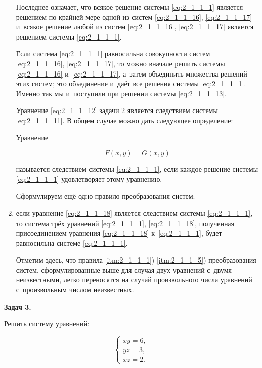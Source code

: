 \begin{enumerate}
Последнее означает, что всякое решение системы \eqref{eq:2_1_1_1} является решением
по крайней мере одной из систем \eqref{eq:2_1_1_16}, \eqref{eq:2_1_1_17} и~всякое
решение любой из систем \eqref{eq:2_1_1_16}, \eqref{eq:2_1_1_17} является решением
системы \eqref{eq:2_1_1_1}.

Если система \eqref{eq:2_1_1_1} равносильна совокупности систем \eqref{eq:2_1_1_16},
\eqref{eq:2_1_1_17}, то можно вначале решить системы
\eqref{eq:2_1_1_16} и~\eqref{eq:2_1_1_17},
а~затем объединить множества решений этих систем;
это объединение и~даёт все решения системы \eqref{eq:2_1_1_1}.
Именно так мы и~поступили при решении системы \eqref{eq:2_1_1_13}.

Уравнение \eqref{eq:2_1_1_12} задачи \hyperlink{ex:2_1_1_2}{2} является следствием системы
\eqref{eq:2_1_1_11}. В общем случае можно дать следующее определение:

Уравнение

\begin{equation}\label{eq:2_1_1_18}
F(x, y) = G(x, y)
\end{equation}

называется следствием системы \eqref{eq:2_1_1_1},
если каждое решение системы \eqref{eq:2_1_1_1} удовлетворяет этому уравнению.

Сформулируем ещё одно правило преобразования систем:

\item \label{itm:2_1_1_5} если уравнение \eqref{eq:2_1_1_18} является следствием системы
\eqref{eq:2_1_1_1}, то система трёх уравнений {\eqref{eq:2_1_1_1}, \eqref{eq:2_1_1_18}},
полученная присоединением уравнения \eqref{eq:2_1_1_18} к~\eqref{eq:2_1_1_1},
будет равносильна системе \eqref{eq:2_1_1_1}.

Отметим здесь, что правила \ref{itm:2_1_1_1})-\ref{itm:2_1_1_5}) преобразования систем,
сформулированные выше для случая двух уравнений с~двумя неизвестными,
легко переносятся на случай произвольного числа уравнений
с~произвольным числом неизвестных.

\end{enumerate}

\hypertarget{ex:2_1_1_3}{\textbf{Задач 3.}} Решить систему уравнений:

\begin{equation}\label{eq:2_1_1_19}
\begin{cases}
xy = 6, \\
yz = 3, \\
xz = 2.
\end{cases}
\end{equation}

